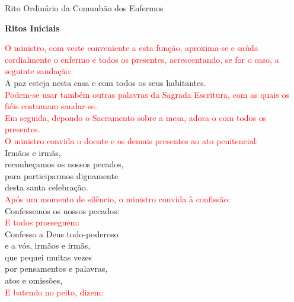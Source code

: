 \documentclass{book}
\begin{document}
\pagestyle{empty}
\begin{center}
    \large Rito Ordinário da Comunhão dos Enfermos
\end{center}
\begin{center}
    \textbf{Ritos Iniciais}
\end{center}
\begin{flushleft}
    \textcolor{red}{O ministro, com veste conveniente a esta função, aproxima-se e saúda cordialmente o enfermo e todos os presentes, acrescentando, se for o caso, a seguinte saudação:}
    \vspace{.1cm} \\
    A paz esteja nesta casa e com todos os seus habitantes.
    \vspace{.1cm} \\
    \textcolor{red}{Podem-se usar também outras palavras da Sagrada Escritura, com as quais os fiéis costumam saudar-se. \\ Em seguida, depondo o Sacramento sobre a mesa, adora-o com todos os presentes. \\ O ministro convida o doente e os demais presentes ao ato penitencial:}
    \vspace{.1cm} \\
    Irmãos e irmãs, \\
    reconheçamos os nossos pecados, \\
    para participarmos dignamente \\
    desta santa celebração.
    \vspace{.1cm} \\
    \textcolor{red}{Após um momento de silêncio, o ministro convida à confissão:}
    \vspace{.1cm} \\
    Confessemos os nossos pecados:
    \vspace{.1cm} \\
    \textcolor{red}{E todos prosseguem:}
    \vspace{.1cm} \\
    Confesso a Deus todo-poderoso \\
    e a vós, irmãos e irmãs, \\
    que pequei muitas vezes \\
    por pensamentos e palavras, \\
    atos e omissões,
    \vspace{.1cm} \\
    \textcolor{red}{E batendo no peito, dizem:}
    \vspace{.1cm} \\

\end{flushleft}
\end{document}
